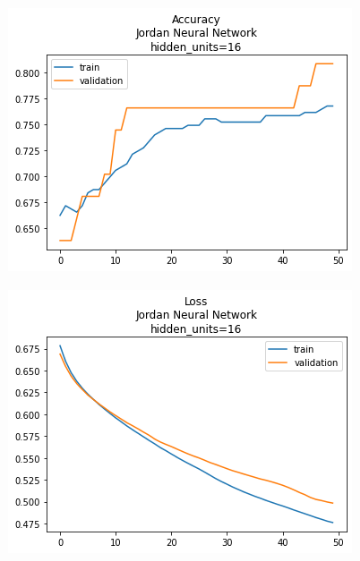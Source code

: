 \documentclass[12pt, a4paper]{article}
\begin{document}
\begin{figure}
\begin{subfigure}{0.45\linewidth}
    \end{subfigure}
    \begin{subfigure}{0.45\linewidth}
        \includegraphics[width=0.9\linewidth]{images/q1/jordan/acc_Jordan Neural Networkhidden_units=16.png}
    \end{subfigure}
    \hfill
    \begin{subfigure}{0.45\linewidth}
        \includegraphics[width=0.9\linewidth]{images/q1/jordan/loss_Jordan Neural Networkhidden_units=16.png}
    \end{subfigure}
    \begin{subfigure}{0.45\linewidth}

\end{subfigure}
\end{figure}
\end{document}
